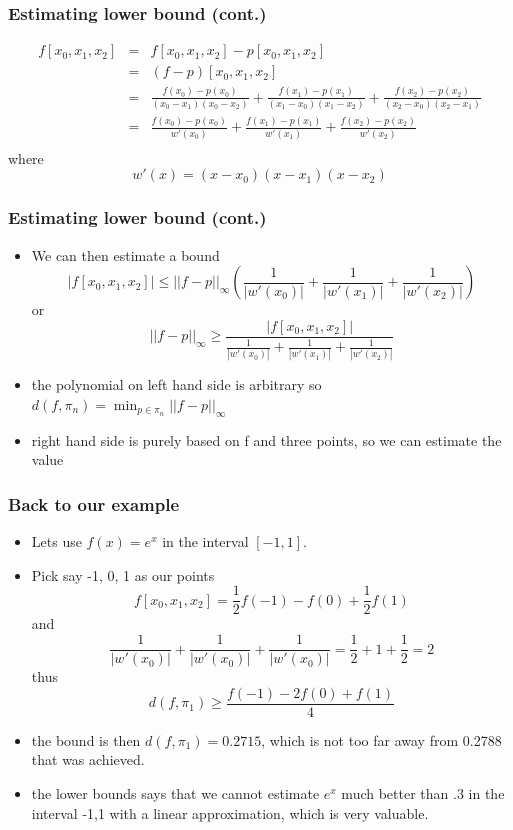 \documentclass[10pt]{beamer}
\begin{document}
\begin{frame}
  \frametitle{Estimating lower bound (cont.)}
    \[
      \begin{array}{rcl}
        f[x_0, x_1, x_2] &=&  f[x_0, x_1, x_2] -  p[x_0, x_1, x_2]\\
                         &=&  (f-p)[x_0, x_1, x_2]\\
                         &=& \frac{f(x_0)-p(x_0)}{(x_0-x_1)(x_0-x_2)}+
                             \frac{f(x_1)-p(x_1)}{(x_1-x_0)(x_1-x_2)}+
                             \frac{f(x_2)-p(x_2)}{(x_2-x_0)(x_2-x_1)}\\
                         &=& \frac{f(x_0)-p(x_0)}{w'(x_0)}+
                             \frac{f(x_1)-p(x_1)}{w'(x_1)}+
                             \frac{f(x_2)-p(x_2)}{w'(x_2)}\\
      \end{array}
    \] where
    \[
      w'(x) = (x-x_0)(x-x_1)(x-x_2)
    \]
\end{frame}

\begin{frame}
  \frametitle{Estimating lower bound (cont.)}
  \begin{itemize}
  \item We can then estimate a bound
    \[
      | f[x_0,x_1,x_2] | \leq ||f-p||_{\infty}
      \left( \frac{1}{|w'(x_0)|} + \frac{1}{|w'(x_1)|} + \frac{1}{|w'(x_2)|} \right)
    \] or
    \[
      ||f-p||_{\infty} \geq \frac{| f[x_0,x_1,x_2] | }{\frac{1}{|w'(x_0)|} + \frac{1}{|w'(x_1)|} + \frac{1}{|w'(x_2)|}}
    \]
  \item the polynomial on left hand side is arbitrary so $d(f,\pi_n) = \min_{p\in \pi_n}||f-p||_{\infty}$
  \item right hand side is purely based on f and three points, so we can estimate the value
  \end{itemize}
\end{frame}

\begin{frame}
  \frametitle{Back to our example}
  \begin{itemize}
  \item Lets use $f(x) = e^x$ in the interval $[-1,1]$.
  \item Pick say -1, 0, 1 as our points
    \[
      f[x_0,x_1,x_2] = \frac{1}{2} f(-1) - f(0) + \frac{1}{2} f(1)
    \] and
    \[
      \frac{1}{|w'(x_0)|} + \frac{1}{|w'(x_0)|} + \frac{1}{|w'(x_0)|} = \frac{1}{2} + 1 + \frac{1}{2} = 2
    \] thus
    \[
      d(f,\pi_1) \geq \frac{f(-1) - 2 f(0) + f(1)}{4}
    \]
  \item the bound is then $d(f,\pi_1) = 0.2715$, which is not too far away from 0.2788 that was achieved.
  \item the lower bounds says that we cannot estimate $e^x$ much
    better than .3 in the interval -1,1 with a linear approximation,
    which is very valuable.
  \end{itemize}
\end{frame}
\end{document}
